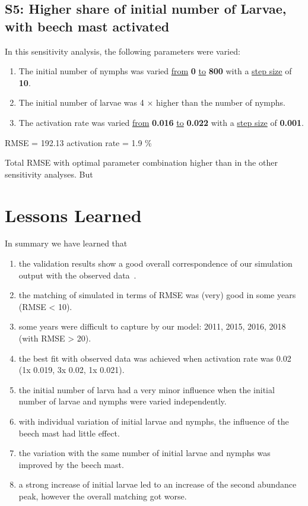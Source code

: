 \documentclass[a4paper, 11pt]{scrartcl}
\begin{document}
\subsection{S5: Higher share of initial number of Larvae, with beech mast activated}
In this sensitivity analysis, the following parameters were varied:

\begin{enumerate}
\item The initial number of nymphs was varied \underline{from} \textbf{0} \underline{to} \textbf{800} with a \underline{step size} of \textbf{10}.
\item The initial number of larvae was 4 $\times$ higher than the number of nymphs.
\item The activation rate was varied \underline{from} \textbf{0.016} \underline{to} \textbf{0.022} with a \underline{step size} of \textbf{0.001}.
\end{enumerate}

RMSE = 192.13
activation rate = 1.9 \%

Total RMSE with optimal parameter combination higher than in the other sensitivity analyses. But


\newpage
\section{Lessons Learned}

In summary we have learned that

\begin{enumerate}
\item the validation results show a good overall correspondence of our simulation output with the observed data~\parencite{Brugger.2017}.
\item the matching of simulated in terms of RMSE was (very) good in some years (RMSE < 10).
\item some years were difficult to capture by our model: 2011, 2015, 2016, 2018 (with RMSE > 20).
\item the best fit with observed data was achieved when activation rate was 0.02 (1x 0.019,  3x 0.02,  1x 0.021).
\item the initial number of larva had a very minor influence when the initial number of larvae and nymphs were varied independently.
\item with individual variation of initial larvae and nymphs, the influence of the beech mast had little effect.
\item the variation with the same number of initial larvae and nymphs was improved by the beech mast.
\item a strong increase of initial larvae led to an increase of the second abundance peak, however the overall matching got worse.
\end{enumerate}
\end{document}
